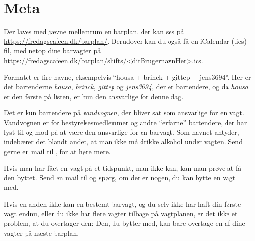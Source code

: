 \section{Meta}
\label{sec:meta}

Der laves med jævne mellemrum en barplan, der kan ses på
\url{https://fredagscafeen.dk/barplan/}. Derudover kan du også få en
iCalendar (.ics) fil, med netop dine barvagter på
\url{https://fredagscafeen.dk/barplan/shifts/<ditBrugernavnHer>.ics}.

Formatet er fire navne, eksempelvis ``housa + brinck +
gittep + jens3694''. Her er det bartenderne \emph{housa},
\emph{brinck}, \emph{gittep} og \emph{jens3694}, der er bartendere, og
da \emph{housa} er den første på listen, er hun den ansvarlige for
denne dag.

Det er kun bartendere på \emph{vandvognen}, der bliver sat som
ansvarlige for en vagt. Vandvognen er for bestyrelsesmedlemmer
og andre ``erfarne'' bartendere, der har lyst til og mod på at være
den ansvarlige for en barvagt. Som navnet antyder, indebærer det
blandt andet, at man ikke må drikke alkohol under vagten. Send gerne
en mail til , for at høre mere.

Hvis man har fået en vagt på et tidspunkt, man ikke kan, kan man prøve
at få den byttet. Send en mail til  og
spørg, om der er nogen, du kan bytte en vagt med.

Hvis en anden ikke kan en bestemt barvagt, og du selv ikke har haft
din første vagt endnu, eller du ikke har flere vagter tilbage på
vagtplanen, er det ikke et problem, at du overtager den: Den, du
bytter med, kan bare overtage en af dine vagter på næste barplan.
